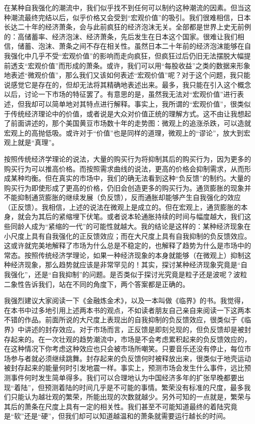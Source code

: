 在某种自我强化的潮流中，我们似乎找不到任何可以制约这种潮流的因素。但当这种潮流最终完结以后，似乎价格又会受到“宏观价值”的吸引。我们很难相信，日本长达二十年的经济萧条，会与此前疯狂的经济泡沫无关。全部都是世界上史无前例的：高储蓄率、经济泡沫、经济萧条，先后发生在日本这个国家。很难让我们相信，储蓄、泡沫、萧条之间不存在相关性。虽然日本二十年前的经济泡沫能够在自我强化中几乎不受“宏观价值”的影响而走向疯狂，但疯狂过后仍旧无法摆脱大幅提前透支“宏观价值”而形成的萧条。或许，我们可以用“每股收益”之类的数据来形象地表述“微观价值”，那么我们又该如何表述“宏观价值”呢？对于这个问题，我只能说感觉它是存在的，但却无法将其精确地表述出来。最多，我只能在引入这个概念以后，讨论一下市场的特征罢了。有意思的是，虽然我无法对“宏观价值”进行表述，但我却可以简单地对其特点进行解释。事实上，我所谓的“宏观价值”，很类似于传统经济理论中的价值，或者说是大众对价值正统的理解方式。这不由让我想起了前面讲述的，那个美国黄豆市场数十年的走势图：微观上的追涨杀跌，可以造就宏观上的高抛低吸。或许对于“价值”也是同样的道理，微观上的“谬论”，放大到宏观上就是“真理”。

按照传统经济学理论的说法，大量的购买行为将抑制其后的购买行为，因为更多的购买行为可以推高价格。而按照需求曲线的说法，更高的价格会抑制需求，从而形成某种均衡。但在真实的市场中，我们的确无法看到这种“负反馈”的制约。大量的购买行为即使形成了更高的价格，仍旧会创造更多的购买行为。通货膨胀的现象并不能抑制通货膨胀的继续发展（负反馈），反而通胀却能够产生自我强化的效应（正反馈）。我相信，上述的说法在微观上是成立的。但在宏观上，通货膨胀的本身，就会为其后的紧缩埋下伏笔。或者说本轮通胀持续的时间与幅度越大，我们这些同龄人成为“紧缩的一代”的可能性就越大。我的结论是这样的：某种经济现象在小尺度上具有自我强化的正反馈效应；而在大尺度上具有自我抑制的负反馈效应。这或许就完美地解释了市场为什么总是不稳定的，也解释了趋势为什么是市场中的常态。按照传统经济学理论，如果一种经济现象的本身就能够（在微观上）抑制这种经济现象，那么趋势就应该是非常罕见的！其实，探讨某种经济现象究竟是“自我强化”，还是“自我抑制”的问题。是否类似于探讨光究竟是粒子还是波呢？波粒二象性告诉我们，站在不同的角度下，两个答案都是正确的。

我强烈建议大家阅读一下《金融炼金术》，以及一本叫做《临界》的书。我觉得，在本书中过多地引用上述两本书的观点，不如读者朋友自己亲自来阅读一下这两本不错的作品。前面所说的大尺度上表现出的自我抑制的负反馈效应，很类似于《临界》中讲述的封存效应。对于市场而言，正反馈是即刻兑现的，但负反馈却是被封存起来的。在一次壮观的趋势潮流中，市场是不会考虑累积起来的负反馈效应的，在这种情况下你考虑这种效应也只会被市场所嘲笑。只要音乐还没有停止，每位市场参与者就必须继续跳舞。封存起来的负反馈何时被释放出来，很类似于地壳运动被封存起来的能量何时引发地震一样。事实上，预测市场会发生什么事件，远比预测事件何时发生简单得多。我们可以合理地认为中国经济多年的扩张早晚都要出现“着陆”，但预测着陆的时间几乎是不可能的事情。繁荣没有标准的尺度，最多我们只能认为越壮观的繁荣，所能出现的次数就越少。另外可知的一点就是，繁荣与其后的萧条在尺度上具有一定的相关性。我们甚至不可能知道最终的着陆究竟是“软”还是“硬”，但我们却可以知道越温和的萧条就需要运行越长的时间。

